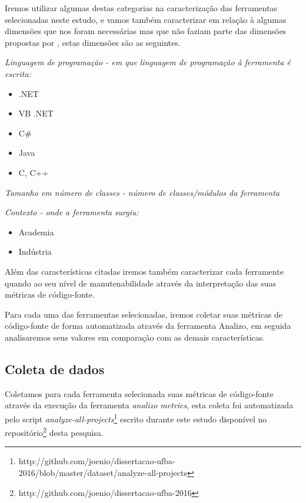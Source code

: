 Iremos utilizar algumas destas categorias na caracterização das ferramentas
selecionadas neste estudo, e vamos também caracterizar em relação à algumas dimensões que nos
foram necessárias mas que não faziam parte das dimensões propostas por ,
estas dimensões são as seguintes.

\begin{description}

  \item {\it Linguagem de programação - em que linguagem de programação à ferramenta é escrita:}
    \begin{itemize}
      \item .NET
      \item VB .NET
      \item C\#
      \item Java
      \item C, C++
    \end{itemize}

  \item {\it Tamanho em número de classes - número de classes/módulos da ferramenta}

  \item {\it Contexto - onde a ferramenta surgiu:}
    \begin{itemize}
      \item Academia
      \item Indústria
    \end{itemize}

\end{description}

Além das características citadas iremos também caracterizar cada ferramente quando ao
seu nível de manutenabilidade através da interpretação das suas métricas de código-fonte.

Para cada uma das ferramentas selecionadas, iremos coletar suas métricas de código-fonte de
forma automatizada através da ferramenta Analizo, em seguida analisaremos seus valores em
comparação com as demais características.

\subsection{Coleta de dados}

Coletamos para cada ferramenta selecionada suas métricas de código-fonte
através da execução da ferramenta {\it analizo metrics}, esta coleta foi
automatizada pelo script {\it
analyze-all-projects}\footnote{http://github.com/joenio/dissertacao-ufba-2016/blob/master/dataset/analyze-all-projects}
escrito durante este estudo disponível no
repositório\footnote{http://github.com/joenio/dissertacao-ufba-2016} desta
pesquisa.

